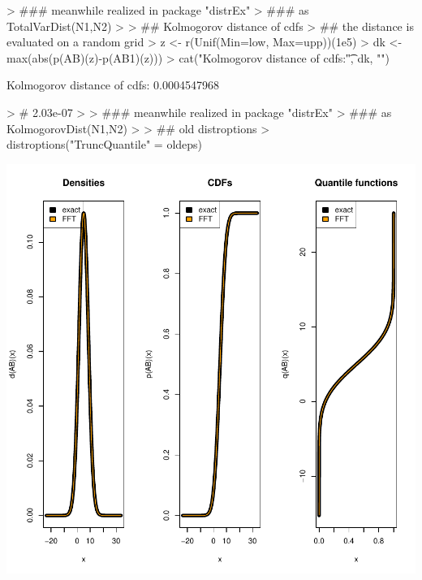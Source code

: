\documentclass[11pt]{article}
\begin{document}
\begin{Schunk}
\begin{Soutput}
\end{Soutput}
\begin{Sinput}
> ### meanwhile realized in package "distrEx" 
> ### as TotalVarDist(N1,N2)
> 
> ## Kolmogorov distance of cdfs 
> ## the distance is evaluated on a random grid
> z <- r(Unif(Min=low, Max=upp))(1e5)
> dk <- max(abs(p(AB)(z)-p(AB1)(z)))
> cat("Kolmogorov distance of cdfs:\t", dk, "\n") 
\end{Sinput}
\begin{Soutput}
Kolmogorov distance of cdfs:	 0.0004547968 
\end{Soutput}
\begin{Sinput}
> # 2.03e-07
> 
> ### meanwhile realized in package "distrEx" 
> ### as KolmogorovDist(N1,N2)
> 
> ## old distroptions
> distroptions("TruncQuantile" = oldeps)
\end{Sinput}
\end{Schunk}
\includegraphics{distr-ConvolutionNormalDistr}
\end{document}
